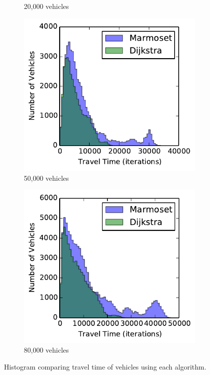 \documentclass[ %
                    author={Alexander Hill},
                supervisor={Dr. Benjamin Sach},
                    degree={MEng},
                     title={MARMOSET},
                  subtitle={Multi-Agent Route Management using Online Simulation for Efficient Transportation},
                      type={research},
                      year={2016} ]{dissertation}
\begin{document}
\begin{figure}[h]
\begin{subfigure}[b]{0.23\textwidth}
        \caption{20,000 vehicles}\label{fig:tt-hist-20k}
    \end{subfigure}
    \begin{subfigure}[b]{0.23\textwidth}
        \centering
        \includegraphics[width=\textwidth]{tt-50k}
        \caption{50,000 vehicles}\label{fig:tt-hist-50k}
    \end{subfigure}
    \begin{subfigure}[b]{0.23\textwidth}
        \centering
        \includegraphics[width=\textwidth]{tt-80k}
        \caption{80,000 vehicles}\label{fig:tt-hist-80k}
    \end{subfigure}
    \caption{Histogram comparing travel time of vehicles using each algorithm.}\label{fig:tt-hist}
\end{figure}
\end{document}
